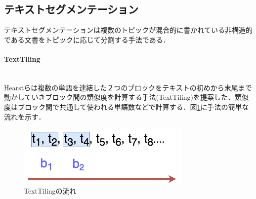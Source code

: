 \subsection{テキストセグメンテーション}
テキストセグメンテーションは複数のトピックが混合的に書かれている非構造的である文書をトピックに応じて分割する手法である．
\paragraph{TextTiling}\ \\
Hearstら\cite{texttiling}は複数の単語を連結した２つのブロックをテキストの初めから末尾まで動かしていきブロック間の類似度を計算する手法(TextTiling)を提案した．類似度はブロック間で共通して使われる単語数などで計算する．図\ref{Fig:textTilingFigure}に手法の簡単な流れを示す．
\begin{figure}[htbp]
 \begin{center}
  \includegraphics[width=\textwidth]{../images/2.Related_Work/textTiling-figure.png}
  \caption{TextTilingの流れ}
  \label{Fig:textTilingFigure}
  \vspace{-10pt}
 \end{center}
\end{figure}

